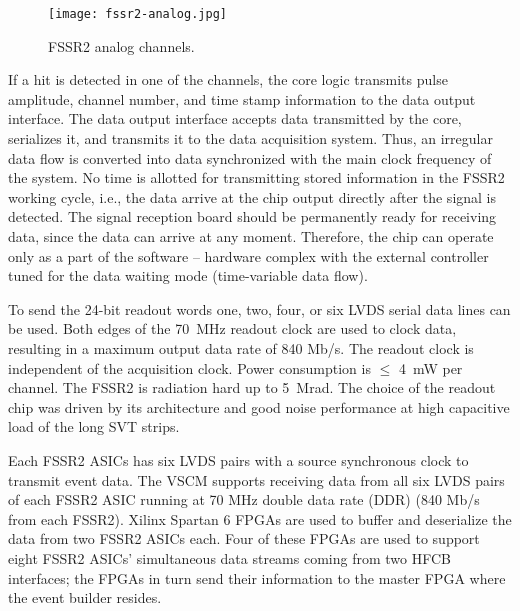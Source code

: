 \begin{figure}[hbt] 
\centering 
\texttt{[image: fssr2-analog.jpg]}
\caption{FSSR2 analog channels.}
\label{fig:fssr2-analog}
\end{figure}

If a hit is detected in one of the channels, the core logic transmits pulse amplitude, channel number, and time stamp information to the data output interface. The data output interface accepts data transmitted by the core, serializes it, and transmits it to the data acquisition system. Thus, an irregular data flow is converted into data synchronized with the main clock frequency of the system. No time is allotted for transmitting stored information in the FSSR2 working cycle, i.e., the data arrive at the chip output directly after the signal is detected. The signal reception board should be permanently ready for receiving data, since the data can arrive at any moment. Therefore, the chip can operate only as a part of the software -- hardware complex with the external controller tuned for the data waiting mode (time-variable data flow). 

To send the 24-bit readout words one, two, four, or six LVDS serial data lines can be used. Both edges of the 70~MHz readout clock are used to clock data, resulting in a maximum output data rate of 840 Mb/s. The readout clock is independent of the acquisition clock. Power consumption is $\le$ 4~mW per channel. The FSSR2 is radiation hard up to 5~Mrad. The choice of the readout chip was driven by its architecture and good noise performance at high capacitive load of the long SVT strips.

Each FSSR2 ASICs has six LVDS pairs with a source synchronous clock to transmit event data. The VSCM supports receiving data from all six LVDS pairs of each FSSR2 ASIC running at 70 MHz double data rate (DDR) (840 Mb/s from each FSSR2). Xilinx Spartan 6 FPGAs are used to buffer and deserialize the data from two FSSR2 ASICs each. Four of these FPGAs are used to support eight FSSR2 ASICs' simultaneous data streams coming from two HFCB interfaces; the FPGAs in turn send their information to the master FPGA where the event builder resides.

